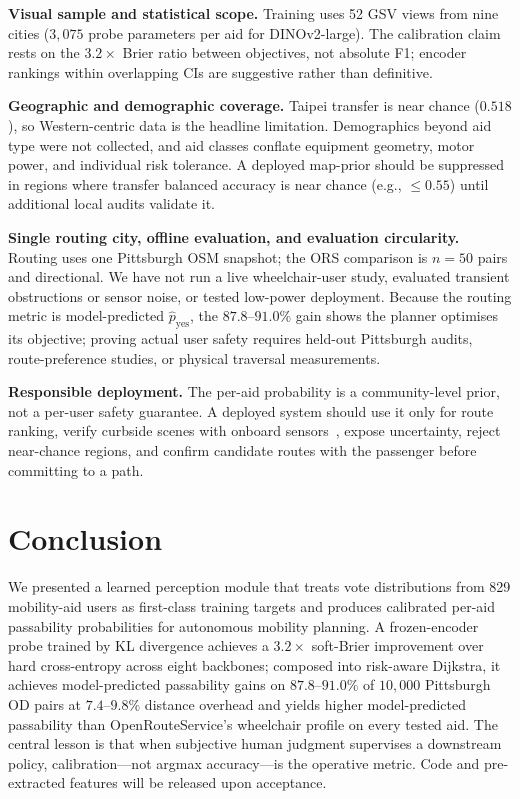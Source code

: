 \documentclass{article}
\begin{document}
\textbf{Visual sample and statistical scope.} Training uses 52 GSV views from nine cities ($3{,}075$ probe parameters per aid for DINOv2-large). The calibration claim rests on the $3.2\times$ Brier ratio between objectives, not absolute F1; encoder rankings within overlapping CIs are suggestive rather than definitive.

\textbf{Geographic and demographic coverage.} Taipei transfer is near chance ($0.518$), so Western-centric data is the headline limitation. Demographics beyond aid type were not collected, and aid classes conflate equipment geometry, motor power, and individual risk tolerance. A deployed map-prior should be suppressed in regions where transfer balanced accuracy is near chance (e.g., $\leq0.55$) until additional local audits validate it.

\textbf{Single routing city, offline evaluation, and evaluation circularity.} Routing uses one Pittsburgh OSM snapshot; the ORS comparison is $n{=}50$ pairs and directional. We have not run a live wheelchair-user study, evaluated transient obstructions or sensor noise, or tested low-power deployment. Because the routing metric is model-predicted $\hat{p}_\mathrm{yes}$, the $87.8$--$91.0\%$ gain shows the planner optimises its objective; proving actual user safety requires held-out Pittsburgh audits, route-preference studies, or physical traversal measurements.

\textbf{Responsible deployment.} The per-aid probability is a community-level prior, not a per-user safety guarantee. A deployed system should use it only for route ranking, verify curbside scenes with onboard sensors~\citep{saha2022mypath}, expose uncertainty, reject near-chance regions, and confirm candidate routes with the passenger before committing to a path.

\section{Conclusion}
\label{sec:conclusion}

We presented a learned perception module that treats vote distributions from 829 mobility-aid users as first-class training targets and produces calibrated per-aid passability probabilities for autonomous mobility planning. A frozen-encoder probe trained by KL divergence achieves a $3.2\times$ soft-Brier improvement over hard cross-entropy across eight backbones; composed into risk-aware Dijkstra, it achieves model-predicted passability gains on $87.8$--$91.0\%$ of $10{,}000$ Pittsburgh OD pairs at $7.4$--$9.8\%$ distance overhead and yields higher model-predicted passability than OpenRouteService's wheelchair profile on every tested aid. The central lesson is that when subjective human judgment supervises a downstream policy, calibration---not argmax accuracy---is the operative metric. Code and pre-extracted features will be released upon acceptance.
\end{document}
